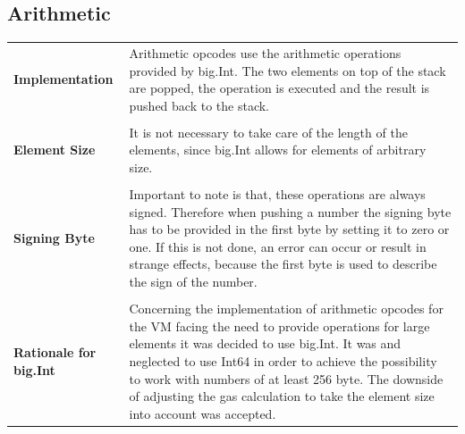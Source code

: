 \subsection{Arithmetic}
\label{arithmetic}
\begin{tabular}[t]{ p{3cm} p{12.5cm}}
\raggedright
\textbf{Implementation} &
Arithmetic opcodes use the arithmetic operations provided by big.Int. The two elements on top of the stack are popped, the operation is executed and the result is pushed back to the stack. \\ \\

\raggedright
\textbf{Element Size} &
It is not necessary to take care of the length of the elements, since big.Int allows for elements of arbitrary size. \\ \\

\raggedright
\textbf{Signing Byte} &
Important to note is that, these operations are always signed. Therefore when pushing a number the signing byte has to be provided in the first byte by setting it to zero or one. If this is not done, an error can occur or result in strange effects, because the first byte is used to describe the sign of the number. \\ \\

\raggedright
\textbf{Rationale for big.Int} &
Concerning the implementation of arithmetic opcodes for the VM
facing the need to provide operations for large elements it was decided to use big.Int. It was and neglected to use Int64 in order to achieve the possibility to work with numbers of at least 256 byte. The downside of adjusting the gas calculation to take the element size into account was accepted. \\
\end{tabular}

